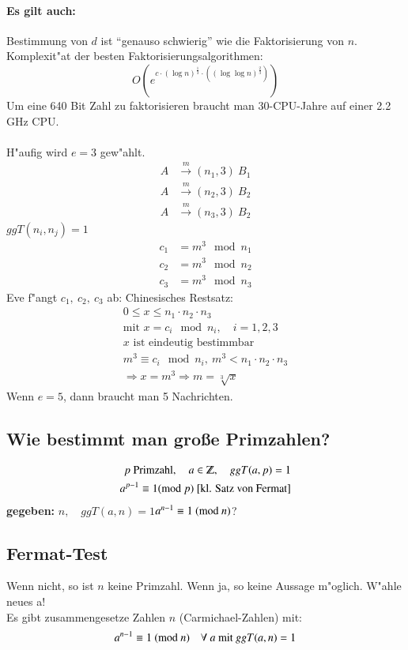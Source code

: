 \paragraph{Es gilt auch:} Bestimmung von $d$ ist "`genauso schwierig"' wie die Faktorisierung von $n$.\\
Komplexit"at der besten Faktorisierungsalgorithmen:
\[
	O(e^{c\cdot (\log n)^{\frac{1}{3}}
	\cdot ((\log \log n)^{\frac{2}{3}})})
\]
Um eine 640 Bit Zahl zu faktorisieren braucht man 30-CPU-Jahre auf einer 2.2 GHz CPU.\\ \\
H"aufig wird $e=3$ gew"ahlt.\\
\begin{align*}
	A &\xrightarrow{\ m \ }(n_1,3)\ B_1 \\
	A &\xrightarrow{\ m \ } (n_2,3)\ B_2 \\
	A &\xrightarrow{\ m \ } (n_3,3)\ B_2
\end{align*}
$ggT(n_i,n_j)=1$
\begin{align*}
	c_1&=m^3\mod{n_1}\\	
	c_2&=m^3\mod{n_2}\\	
	c_3&=m^3\mod{n_3}
\end{align*}
Eve f"angt $c_1,\ c_2,\ c_3$ ab: Chinesisches Restsatz:
\begin{align*}
		0 \leq x \leq n_1 \cdot n_2 \cdot n_3\\ 
		\text{mit } x=c_i\mod{n_i},\quad i=1,2,3\\
		x \text{ ist eindeutig bestimmbar}\\
		m^3 \equiv c_i\mod{n_i},\ m^3 < n_1 \cdot n_2 \cdot n_3\\
		\Rightarrow x = m^3 \Rightarrow m=\sqrt[3]{x}
\end{align*}
Wenn $e=5$, dann braucht man 5 Nachrichten.

\subsection{Wie bestimmt man gro\ss e Primzahlen?}

\begin{align*}
	p	\text{ Primzahl},\quad a \in \Z,\quad ggT(a,p)=1\\
	a^{p-1} \equiv 1 (\md{p}) \text{ [kl. Satz von Fermat]}
\end{align*}
\textbf{gegeben:} $n,\quad ggT(a,n)=1$\quad $a^{n-1} \equiv 1\ (\text{mod }n)$?
\subsection{Fermat-Test} Wenn nicht, so ist $n$ keine Primzahl. Wenn ja, so keine Aussage m"oglich. W"ahle neues a!\\
Es gibt zusammengesetze Zahlen $n$ (Carmichael-Zahlen) mit:
\[
	a^{n-1} \equiv 1\ (\md{n})\quad \forall\ a \text{ mit } ggT(a,n)=1
\]

